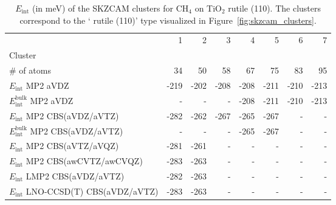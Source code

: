 \begin{table}
\caption{\label{tab:system_eint_r-tio2_ch4}$E_\textrm{int}$ (in meV) of the SKZCAM clusters for CH$_4$ on TiO$_2$ rutile (110). The clusters correspond to the ` rutile (110)' type visualized in Figure~\ref{fig:skzcam_clusters}.}
\begin{adjustbox}{center,max width=1.4\textwidth}
\begin{tabular}{lrrrrrrr}
\toprule
 & 1 & 2 & 3 & 4 & 5 & 6 & 7 \\ 
Cluster &  &  &  &  &  &  &  \\
\midrule
\# of atoms & 34 & 50 & 58 & 67 & 75 & 83 & 95 \\
$E_\textrm{int}$ MP2 aVDZ & -219 & -202 & -208 & -208 & -211 & -210 & -213 \\
$E_\textrm{int}^\textrm{bulk}$ MP2 aVDZ & - & - & - & -208 & -211 & -210 & -213 \\
$E_\textrm{int}$ MP2 CBS(aVDZ/aVTZ) & -282 & -262 & -267 & -265 & -267 & - & - \\
$E_\textrm{int}^\textrm{bulk}$ MP2 CBS(aVDZ/aVTZ) & - & - & - & -265 & -267 & - & - \\
$E_\textrm{int}$ MP2 CBS(aVTZ/aVQZ) & -281 & -261 & - & - & - & - & - \\
$E_\textrm{int}$ MP2 CBS(awCVTZ/awCVQZ) & -283 & -263 & - & - & - & - & - \\
$E_\textrm{int}$ LMP2 CBS(aVDZ/aVTZ) & -282 & -263 & - & - & - & - & - \\
$E_\textrm{int}$ LNO-CCSD(T) CBS(aVDZ/aVTZ) & -283 & -263 & - & - & - & - & - \\
\bottomrule
\end{tabular}
\end{adjustbox}
\end{table}


